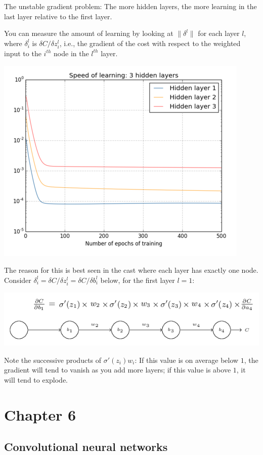 \documentclass[12pt]{article}
\begin{document}
The unstable gradient problem: The more hidden layers, the more learning in the last layer relative to the first layer.

You can measure the amount of learning by looking at $\| \delta^l \|$ for each layer $l$, where $\delta_i^l$ is $\delta C/\delta z_i^l$, i.e., the gradient of the cost with respect to the weighted input to the $i^{th}$ node in the $l^{th}$ layer.

\includegraphics[scale=0.8]{vanishing-gradient}

The reason for this is best seen in the cast where each layer has exactly one node. Consider $\delta_i^l = \delta C/\delta z_i^l = \delta C/\delta b_i^l$ below, for the first layer $l=1$:

\includegraphics[scale=0.8]{product-of-gradients}

Note the successive products of $\sigma'(z_i)w_i$: If this value is on average below $1$, the gradient will tend to vanish as you add more layers; if this value is above $1$, it will tend to explode.

\section*{Chapter 6}

\subsection*{Convolutional neural networks}
\end{document}
